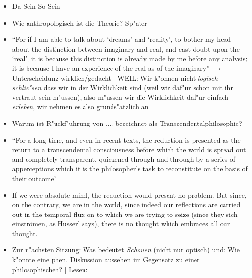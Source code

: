 \documentclass[emulatestandardclasses]{scrartcl}
\begin{document}
\begin{itemize}
  \item Da-Sein So-Sein
  \item Wie anthropologisch ist die Theorie? Sp"ater
  \item "`For if I am able to talk about ‘dreams’ and ‘reality’, to bother my head about the distinction between imaginary and real, and cast doubt upon the ‘real’, it is because this distinction is already made by me before any analysis; it is because I have an experience of the real as of the imaginary"' $\rightarrow$ Unterscheidung wirklich/gedacht | WEIL: Wir k"onnen nicht \emph{logisch schlie"sen} dass wir in der Wirklichkeit sind (weil wir daf"ur schon mit ihr vertraut sein m"ussen), also m"ussen wir die Wirklichkeit daf"ur einfach \emph{erleben}, wir nehmen es also grunds"atzlich an
  \item Warum ist R"uckf"uhrung von .... bezeichnet als Transzendentalphilosophie?
  \item "`For a long time, and even in recent texts, the reduction is presented as the return to a transcendental consciousness before which the world is spread out and completely transparent, quickened through and through by a series of apperceptions which it is the philosopher’s task to reconstitute on the basis of their outcome"'
  \item If we were absolute mind, the reduction would present no problem. But since, on the contrary, we are in the world, since indeed our reflections are carried out in the temporal flux on to which we are trying to seize (since they sich einströmen, as Husserl says), there is no thought which embraces all our thought.
  \item Zur n"achsten Sitzung: Was bedeutet \emph{Schauen} (nicht nur optisch) und: Wie k"onnte eine phen. Diskussion aussehen im Gegensatz zu einer philosophischen? | Lesen: 
\end{itemize}
\end{document}
